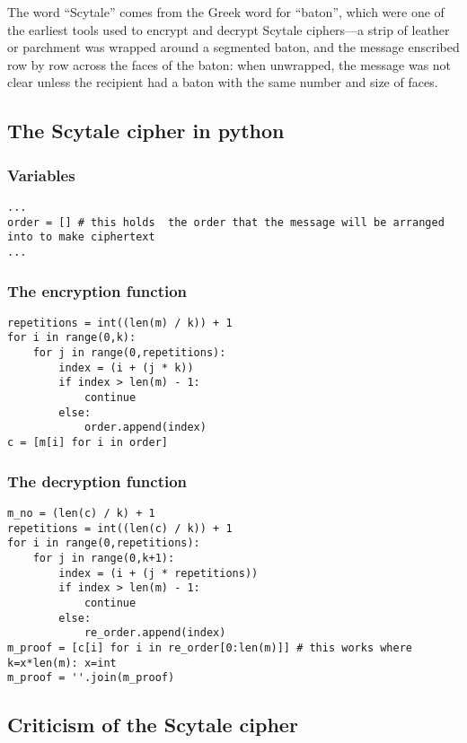 \documentclass{AIAA}
\begin{document}
The word ``Scytale'' comes from the Greek word for ``baton'', which were one of the earliest tools used to encrypt and decrypt Scytale ciphers---a strip of leather or parchment was wrapped around a segmented baton, and the message enscribed row by row across the faces of the baton: when unwrapped, the message was not clear unless the recipient had a baton with the same number and size of faces.

\subsection{The Scytale cipher in python}

\subsubsection{Variables}

\begin{verbatim}
...
order = [] # this holds  the order that the message will be arranged into to make ciphertext
...
\end{verbatim}

\subsubsection{The encryption function}

\begin{verbatim}
repetitions = int((len(m) / k)) + 1
for i in range(0,k):
    for j in range(0,repetitions):
        index = (i + (j * k))
        if index > len(m) - 1:
            continue
        else:
            order.append(index)
c = [m[i] for i in order]
\end{verbatim}

\subsubsection{The decryption function}

\begin{verbatim}
m_no = (len(c) / k) + 1
repetitions = int((len(c) / k)) + 1
for i in range(0,repetitions):
    for j in range(0,k+1):
        index = (i + (j * repetitions))
        if index > len(m) - 1:
            continue
        else:
            re_order.append(index)
m_proof = [c[i] for i in re_order[0:len(m)]] # this works where k=x*len(m): x=int
m_proof = ''.join(m_proof)
\end{verbatim}

\subsection{Criticism of the Scytale cipher}
\end{document}
